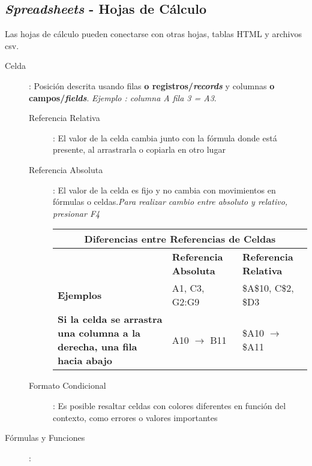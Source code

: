 
\subsection{\textit{Spreadsheets} - Hojas de Cálculo}
Las hojas de cálculo pueden conectarse con otras hojas, tablas HTML y archivos \gls{csv}.
\begin{description}
    \item[Celda]{ : Posición descrita usando filas \textbf{o registros/\textit{records}} y columnas \textbf{o campos/\textit{fields}}. \textit{Ejemplo : columna A fila 3 = A3}. 
    \begin{description}
        \item[Referencia Relativa]{ : El valor de la celda cambia junto con la fórmula donde está presente, al arrastrarla o copiarla en otro lugar}
        \item[Referencia Absoluta]{ : El valor de la celda es fijo y no cambia con movimientos en fórmulas o celdas.\textit{Para realizar cambio entre absoluto y relativo, presionar F4}}
        \begin{table}
            \centering
            \begin{tabular}{|p{5cm}|p{4.5cm}|p{4.5cm}|}
                \hline
                \multicolumn{3}{|c|}{Diferencias entre Referencias de Celdas} \\
                \hline
                & \textbf{Referencia Absoluta} & \textbf{Referencia Relativa} \\
                \hline
                \textbf{Ejemplos} & A1, C3, G2:G9 & \$A\$10, C\$2, \$D3 \\
                \hline
                \textbf{Si la celda se arrastra una columna a la derecha, una fila hacia abajo} & A10 $\rightarrow$ B11 & \$A10 $\rightarrow$ \$A11 \\
                \hline
            \end{tabular}
        \end{table}
        \item[Formato Condicional]{ : Es posible resaltar celdas con colores diferentes en función del contexto, como errores o valores importantes}
    \end{description}}
    \item[Fórmulas y Funciones]{ : 
    }
\end{description}
